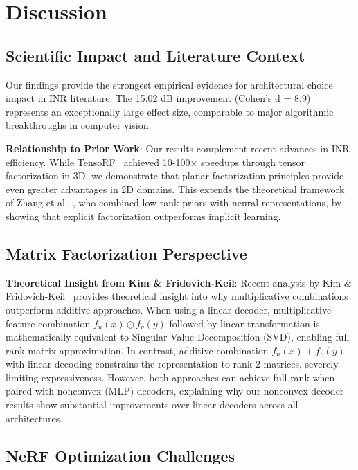 \documentclass{article}
\begin{document}
\section{Discussion}

\subsection{Scientific Impact and Literature Context}

Our findings provide the strongest empirical evidence for architectural choice impact in INR literature. The 15.02 dB improvement (Cohen's d = 8.9) represents an exceptionally large effect size, comparable to major algorithmic breakthroughs in computer vision.

\textbf{Relationship to Prior Work}: Our results complement recent advances in INR efficiency. While TensoRF~\cite{chen2022tensorf} achieved 10-100× speedups through tensor factorization in 3D, we demonstrate that planar factorization principles provide even greater advantages in 2D domains. This extends the theoretical framework of Zhang et al.~\cite{zhang2025lorein}, who combined low-rank priors with neural representations, by showing that explicit factorization outperforms implicit learning.

\subsection{Matrix Factorization Perspective}

\textbf{Theoretical Insight from Kim \& Fridovich-Keil}: Recent analysis by Kim \& Fridovich-Keil~\cite{kim2025grids} provides theoretical insight into why multiplicative combinations outperform additive approaches. When using a linear decoder, multiplicative feature combination $f_u(x) \odot f_v(y)$ followed by linear transformation is mathematically equivalent to Singular Value Decomposition (SVD), enabling full-rank matrix approximation. In contrast, additive combination $f_u(x) + f_v(y)$ with linear decoding constrains the representation to rank-2 matrices, severely limiting expressiveness. However, both approaches can achieve full rank when paired with nonconvex (MLP) decoders, explaining why our nonconvex decoder results show substantial improvements over linear decoders across all architectures.

\subsection{NeRF Optimization Challenges}
\end{document}
